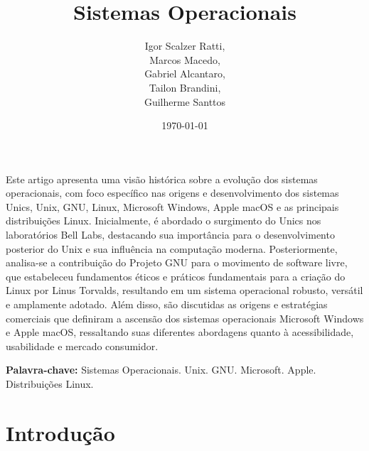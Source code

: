 \documentclass[12pt,oneside,a4paper]{abntex2}
\title{\huge Sistemas Operacionais}
\author{
    Igor Scalzer Ratti,\\
    Marcos Macedo,\\
    Gabriel Alcantaro,\\
    Tailon Brandini,\\
    Guilherme Santtos
}
\date{\today}
\begin{document}
\maketitle
\pagestyle{plain}       %
\thispagestyle{empty}
\setcounter{page}{0}
\setlength{\jot}{15pt}

\newpage

\tableofcontents
{}
\thispagestyle{plain}
\setcounter{page}{1}

\newpage


\begin{resumo}

    Este artigo apresenta uma visão histórica sobre a evolução dos sistemas operacionais, com foco específico nas origens e desenvolvimento dos sistemas Unics, Unix, GNU, Linux, Microsoft Windows, Apple macOS e as principais distribuições Linux. Inicialmente, é abordado o surgimento do Unics nos laboratórios Bell Labs, destacando sua importância para o desenvolvimento posterior do Unix e sua influência na computação moderna. Posteriormente, analisa-se a contribuição do Projeto GNU para o movimento de software livre, que estabeleceu fundamentos éticos e práticos fundamentais para a criação do Linux por Linus Torvalds, resultando em um sistema operacional robusto, versátil e amplamente adotado. Além disso, são discutidas as origens e estratégias comerciais que definiram a ascensão dos sistemas operacionais Microsoft Windows e Apple macOS, ressaltando suas diferentes abordagens quanto à acessibilidade, usabilidade e mercado consumidor.

    \vspace{0.5cm}

    \noindent \textbf{Palavra-chave:} Sistemas Operacionais. Unix. GNU. Microsoft. Apple. Distribuições Linux.
    
\end{resumo}

\section{Introdução}
\end{document}
